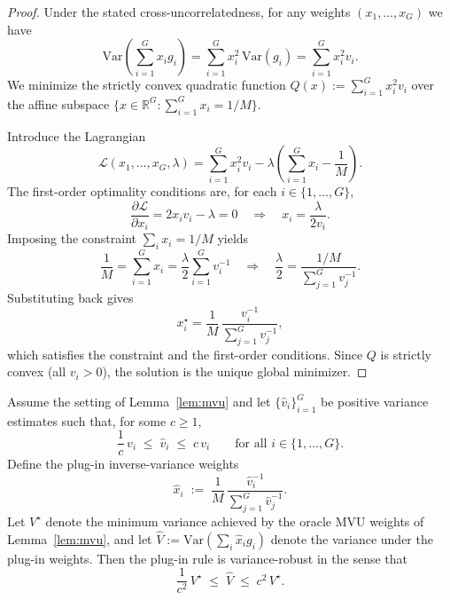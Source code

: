 \begin{proof}
Under the stated cross-uncorrelatedness, for any weights $(x_1,\dots,x_G)$ we have
\[
\mathrm{Var}\!\left(\sum_{i=1}^G x_i g_i\right)
=\sum_{i=1}^G x_i^2\,\mathrm{Var}(g_i)
=\sum_{i=1}^G x_i^2 v_i.
\]
We minimize the strictly convex quadratic function $Q(x):=\sum_{i=1}^G x_i^2 v_i$
over the affine subspace $\{x\in\mathbb{R}^G:\sum_{i=1}^G x_i=1/M\}$.

Introduce the Lagrangian
\[
\mathcal{L}(x_1,\dots,x_G,\lambda)
=\sum_{i=1}^G x_i^2 v_i
-\lambda\left(\sum_{i=1}^G x_i-\frac{1}{M}\right).
\]
The first-order optimality conditions are, for each $i\in\{1,\dots,G\}$,
\[
\frac{\partial \mathcal{L}}{\partial x_i}=2x_i v_i-\lambda=0
\quad\Longrightarrow\quad
x_i=\frac{\lambda}{2v_i}.
\]
Imposing the constraint $\sum_i x_i=1/M$ yields
\[
\frac{1}{M}=\sum_{i=1}^G x_i=\frac{\lambda}{2}\sum_{i=1}^G v_i^{-1}
\quad\Longrightarrow\quad
\frac{\lambda}{2}=\frac{1/M}{\sum_{j=1}^G v_j^{-1}}.
\]
Substituting back gives
\[
x_i^\star=\frac{1}{M}\,\frac{v_i^{-1}}{\sum_{j=1}^G v_j^{-1}},
\]
which satisfies the constraint and the first-order conditions.
Since $Q$ is strictly convex (all $v_i>0$), the solution is the unique global minimizer.
\end{proof}

\begin{proposition}\label{prop:plugin_robust}
Assume the setting of Lemma~\ref{lem:mvu} and let $\{\widehat{v}_i\}_{i=1}^G$ be positive variance estimates such that, for some $c\ge 1$,
\begin{equation}
  \frac{1}{c}\,v_i \;\le\; \widehat{v}_i \;\le\; c\,v_i
  \qquad \text{for all } i\in\{1,\dots,G\}.
  \label{eq:vi-mult-error}
\end{equation}
Define the plug-in inverse-variance weights
\[
\widehat{x}_i \;:=\; \frac{1}{M}\,\frac{\widehat{v}_i^{-1}}{\sum_{j=1}^G \widehat{v}_j^{-1}}.
\]
Let $V^\star$ denote the minimum variance achieved by the oracle MVU weights of Lemma~\ref{lem:mvu}, and let
$\widehat{V}:=\mathrm{Var}(\sum_i \widehat{x}_i g_i)$ denote the variance under the plug-in weights.
Then the plug-in rule is variance-robust in the sense that
\[
\frac{1}{c^2}\,V^\star \;\le\; \widehat{V} \;\le\; c^2\,V^\star.
\]
\end{proposition}

